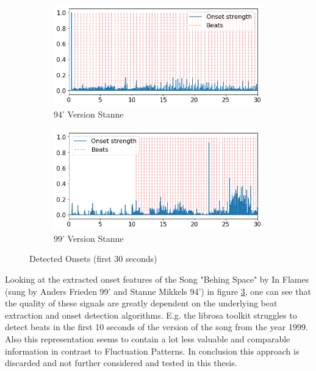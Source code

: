 \begin{figure}[htbp]
{{			\begin{subfigure}{.495\textwidth}
				\centering    
				\includegraphics[scale=0.3]{Images/Beat/s_s_on.png}
				\caption{94' Version Stanne}
				\label{saon}
			\end{subfigure}		
			\begin{subfigure}{.495\textwidth}
				\centering     
				\includegraphics[scale=0.3]{Images/Beat/s_a_on.png}
				\caption{99' Version Stanne}
				\label{sson}
			\end{subfigure}%
				
	}}
	\caption{Detected Onsets (first 30 seconds)}
	\label{fig:ons1}
\end{figure}	

Looking at the extracted onset features of the Song "Behing Space" by In Flames (sung by Anders Frieden 99' and Stanne Mikkels 94') in figure \ref{fig:ons1}, one can see that the quality of these signals are greatly dependent on the underlying beat extraction and onset detection algorithms. E.g. the librosa toolkit struggles to detect beats in the first 10 seconds of the version of the song from the year 1999. Also this representation seems to contain a lot less valuable and comparable information in contrast to Fluctuation Patterns. 
In conclusion this approach is discarded and not further considered and tested in this thesis.  

